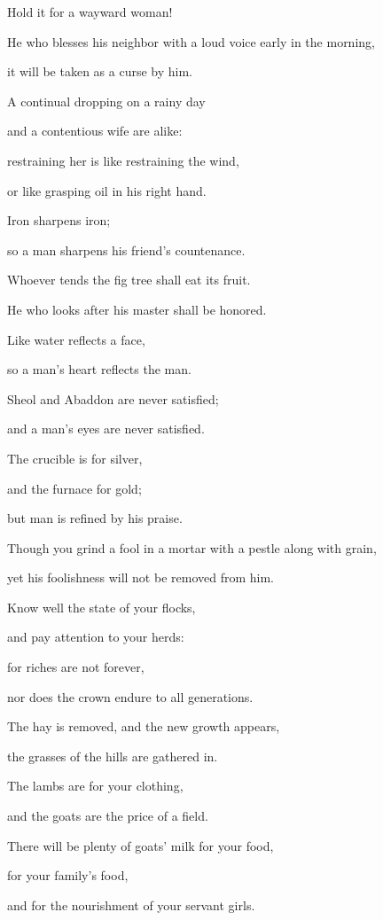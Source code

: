 {\par }{\QB Hold it for a wayward woman!
\par }{\Q {}He who blesses his neighbor with a loud voice early in the morning,
\par }{\QB it will be taken as a curse by him.
\par }{\Q {}A continual dropping on a rainy day
\par }{\QB and a contentious wife are alike:
\par }{\Q {}restraining her is like restraining the wind,
\par }{\QB or like grasping oil in his right hand.
\par }{\BB \par }{\Q {}Iron sharpens iron;
\par }{\QB so a man sharpens his friend’s countenance.
\par }{\Q {}Whoever tends the fig tree shall eat its fruit.
\par }{\QB He who looks after his master shall be honored.
\par }{\Q {}Like water reflects a face,
\par }{\QB so a man’s heart reflects the man.
\par }{\Q {}Sheol and Abaddon are never satisfied;
\par }{\QB and a man’s eyes are never satisfied.
\par }{\Q {}The crucible is for silver,
\par }{\QB and the furnace for gold;
\par }{\QB but man is refined by his praise.
\par }{\Q {}Though you grind a fool in a mortar with a pestle along with grain,
\par }{\QB yet his foolishness will not be removed from him.
\par }{\BB \par }{\Q {}Know well the state of your flocks,
\par }{\QB and pay attention to your herds:
\par }{\Q {}for riches are not forever,
\par }{\QB nor does the crown endure to all generations.
\par }{\Q {}The hay is removed, and the new growth appears,
\par }{\QB the grasses of the hills are gathered in.
\par }{\Q {}The lambs are for your clothing,
\par }{\QB and the goats are the price of a field.
\par }{\Q {}There will be plenty of goats’ milk for your food,
\par }{\QB for your family’s food,
\par }{\QB and for the nourishment of your servant girls.

}
